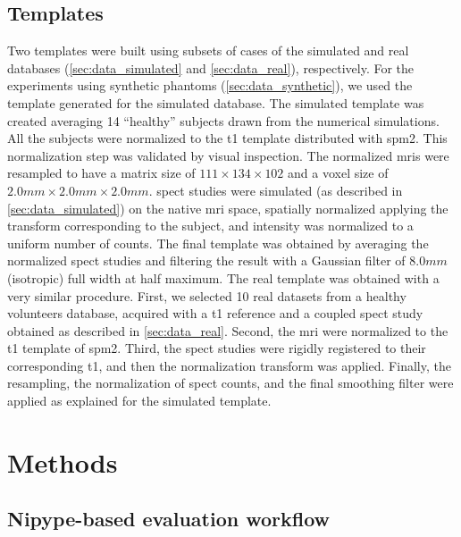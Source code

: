 \documentclass{frontiers}
\begin{document}
\subsection{Templates} %
\label{sec:data_templates}

Two templates were built using subsets of cases of the simulated and real
  databases (\autoref{sec:data_simulated} and \autoref{sec:data_real}), respectively.
For the experiments using synthetic phantoms (\autoref{sec:data_synthetic}),
  we used the template generated for the simulated database.
The simulated template was created averaging 14 ``healthy'' subjects drawn from
  the numerical simulations.
All the subjects were normalized to the \gls*{t1} template distributed with
  \gls*{spm}2.
This normalization step was validated by visual inspection.
The normalized \glspl*{mri} were resampled to have a matrix size of
  $111\times134\times102$ and a voxel size of $2.0mm\times2.0mm\times2.0mm$.
\Gls*{spect} studies were simulated (as described in \autoref{sec:data_simulated})
  on the native \gls*{mri} space, spatially normalized applying the transform
  corresponding to the subject, and intensity was normalized to a
  uniform number of counts.
The final template was obtained by averaging the normalized \gls*{spect} studies
  and filtering the result with a Gaussian filter of $8.0mm$ (isotropic)
  full width at half maximum.
The real template was obtained with a very similar procedure. 
First, we selected 10 real datasets from a healthy volunteers database, acquired
  with a \gls*{t1} reference and a coupled \gls*{spect} study obtained as
  described in \autoref{sec:data_real}.
Second, the \gls*{mri} were normalized to the \gls*{t1} template of \gls*{spm}2.
Third, the \gls*{spect} studies were rigidly registered to their corresponding \gls*{t1}, 
  and then the normalization transform was applied.
Finally, the resampling, the normalization of \gls*{spect} counts, and the final
  smoothing filter were applied as explained for the simulated template.

\section{Methods}
\label{sec:methods}

\subsection{Nipype-based evaluation workflow}
\label{sec:evaluation}
\end{document}
